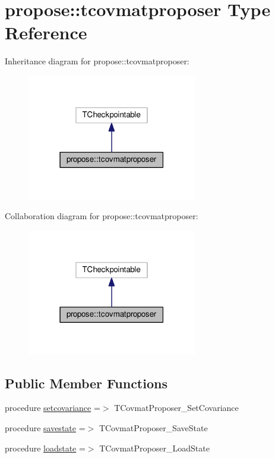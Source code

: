 \hypertarget{structpropose_1_1tcovmatproposer}{}\section{propose\+:\+:tcovmatproposer Type Reference}
\label{structpropose_1_1tcovmatproposer}


Inheritance diagram for propose\+:\+:tcovmatproposer\+:
\nopagebreak
\begin{figure}[H]
\begin{center}
\leavevmode
\includegraphics[width=210pt]{structpropose_1_1tcovmatproposer__inherit__graph}
\end{center}
\end{figure}


Collaboration diagram for propose\+:\+:tcovmatproposer\+:
\nopagebreak
\begin{figure}[H]
\begin{center}
\leavevmode
\includegraphics[width=210pt]{structpropose_1_1tcovmatproposer__coll__graph}
\end{center}
\end{figure}
\subsection*{Public Member Functions}
\begin{DoxyCompactItemize}
\item 
procedure \mbox{\hyperlink{structpropose_1_1tcovmatproposer_a5c6a0230f2b45425a29e0fe36f2efc66}{setcovariance}} =$>$ T\+Covmat\+Proposer\+\_\+\+Set\+Covariance
\item 
procedure \mbox{\hyperlink{structpropose_1_1tcovmatproposer_acc6c09ce73396213348ce5ccaaaeb3f4}{savestate}} =$>$ T\+Covmat\+Proposer\+\_\+\+Save\+State
\item 
procedure \mbox{\hyperlink{structpropose_1_1tcovmatproposer_aa117956bbec881658a918abb09c6e630}{loadstate}} =$>$ T\+Covmat\+Proposer\+\_\+\+Load\+State
\end{DoxyCompactItemize}
